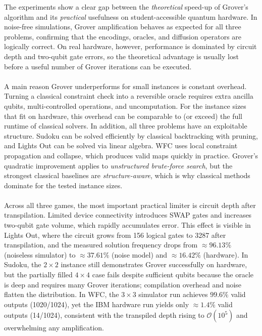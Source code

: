 The experiments show a clear gap between the \emph{theoretical} speed-up of Grover’s algorithm and its \emph{practical} usefulness on student-accessible quantum hardware. In noise-free simulations, Grover amplification behaves as expected for all three problems, confirming that the encodings, oracles, and diffusion operators are logically correct. On real hardware, however, performance is dominated by circuit depth and two-qubit gate errors, so the theoretical advantage is usually lost before a useful number of Grover iterations can be executed.
\\
\\
A main reason Grover underperforms for small instances is constant overhead. Turning a classical constraint check into a reversible oracle requires extra ancilla qubits, multi-controlled operations, and uncomputation. For the instance sizes that fit on hardware, this overhead can be comparable to (or exceed) the full runtime of classical solvers. In addition, all three problems have an exploitable structure. Sudoku can be solved efficiently by classical backtracking with pruning, and Lights Out can be solved via linear algebra. WFC uses local constraint propagation and collapse, which produces valid maps quickly in practice. Grover’s quadratic improvement applies to \emph{unstructured brute-force search}, but the strongest classical baselines are \emph{structure-aware}, which is why classical methods dominate for the tested instance sizes.
\\
\\
Across all three games, the most important practical limiter is circuit depth after transpilation. Limited device connectivity introduces SWAP gates and increases two-qubit gate volume, which rapidly accumulates error. This effect is visible in Lights Out, where the circuit grows from 156 logical gates to 3287 after transpilation, and the measured solution frequency drops from $\approx 96.13\%$ (noiseless simulator) to $\approx 37.61\%$ (noise model) and $\approx 16.42\%$ (hardware). In Sudoku, the $2\times 2$ instance still demonstrates Grover successfully on hardware, but the partially filled $4\times 4$ case fails despite sufficient qubits because the oracle is deep and requires many Grover iterations; compilation overhead and noise flatten the distribution. In WFC, the $3\times 3$ simulator run achieves $99.6\%$ valid outputs (1020/1024), yet the IBM hardware run yields only $\approx 1.4\%$ valid outputs (14/1024), consistent with the transpiled depth rising to $\mathcal{O}(10^5)$ and overwhelming any amplification.
